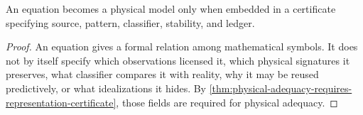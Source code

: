 \begin{corollary}
\label{cor:equation-not-yet-physical-model}
An equation becomes a physical model only when embedded in a certificate specifying source, pattern, classifier, stability, and ledger.
\end{corollary}

\begin{proof}
An equation gives a formal relation among mathematical symbols. It does not by itself specify which observations licensed it, which physical signatures it preserves, what classifier compares it with reality, why it may be reused predictively, or what idealizations it hides. By \autoref{thm:physical-adequacy-requires-representation-certificate}, those fields are required for physical adequacy.
\end{proof}
